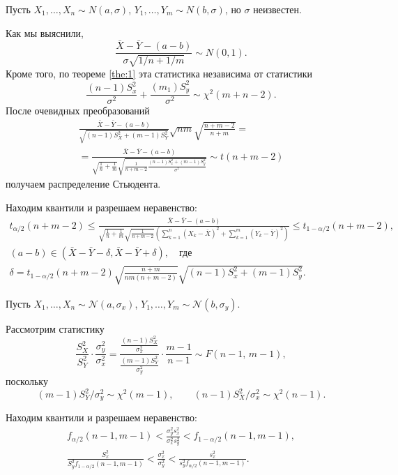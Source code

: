\begin{ex}[для $\Delta a$ при неизвестном $ \sigma_1 = \sigma_2 $]
Пусть $X_1, \dots, X_n \sim N(a, \sigma)$, $Y_1, \dots, Y_m \sim N(b, \sigma)$,
но $\sigma$ неизвестен.

Как мы выяснили,
\[
  \frac{\bar X - \bar Y - (a-b)}{\sigma \sqrt{1/n + 1/m}} \sim N(0, 1).
\]
Кроме того, по теореме \ref{the:1} эта статистика независима от статистики
\[
	\frac{(n-1)S_x^2}{\sigma^2} + \frac{(m_1) S_y^2}{\sigma^2} \sim \chi^2(m+n-2).
\]
После очевидных преобразований 
\begin{multline*}
	\frac{\bar X - \bar Y - (a-b)}{\sqrt{(n-1)S^2_X+(m-1)S^2_Y}} \sqrt{nm}
	\sqrt{\frac{n+m -2}{n+m}}= \\ =
	\frac{\bar X - \bar Y - (a-b)}{\sqrt{\frac1n + \frac1m}
	\sqrt{\frac{1}{n+m-2} \frac{(n-1) S_x^2 + (m-1)S_y^2}{\sigma^2}}} \sim
	t(n+m-2)
\end{multline*}
получаем распределение Стьюдента.

Находим квантили и разрешаем неравенство:
\begin{gather*}
	t_{\alpha/2}(n+m-2) \leqslant \frac{\bar X - \bar Y - (a-b)}{\sqrt{
	\frac{1}{n}+ \frac{1}{m}} \sqrt{ \frac{1}{n+m - 2}} \left( \sum_{k=1}^n \left(
X_k - \bar X\right)^2 + \sum_{k=1}^m \left( Y_k - \bar Y \right)^2 \right) }
\leqslant t_{1-\alpha/2} (n+m-2),\\
	(a-b) \in (\bar X - \bar Y - \delta, \bar X - \bar Y + \delta), \quad
	\text{где}\\
\delta = t_{1-\alpha/2} (n+m-2) \sqrt{\frac{n+m}{nm(n+m-2)}} \sqrt{(n-1)S_x^2 +
(m-1) S_y^2}.
\end{gather*}
\end{ex}

\begin{ex}
Пусть $X_1, \dots, X_n \sim \mathscr N(a, \sigma_x)$, $Y_1, \dots, Y_m
\sim\mathscr N(b, \sigma_y)$.

Рассмотрим статистику  
\[
		\frac{S^2_X}{S^2_Y}\cdot \frac{\sigma^2_y}{\sigma^2_x} =
		\frac{\frac{(n-1)S^2_X}{\sigma^2_x}}{\frac{(m-1)S^2_Y}{\sigma^2_y}} \cdot
		\frac{m-1}{n-1} \sim F(n-1,\,m-1),
\]
поскольку
\[
(m-1) S_Y^2 / \sigma_y^2 \sim \chi^2(m-1),\qquad (n-1) S_X^2 / \sigma_x^2 \sim
\chi^2(n-1).
\]

Находим квантили и разрешаем неравенство:
\begin{gather*}
f_{\alpha/2} (n-1, m-1) < \frac{\sigma_y^2 s_x^2}{\sigma_x^2 s_y^2} <
f_{1-\alpha/2} (n-1, m-1), \\
\frac{S_x^2}{S_y^2 f_{1-\alpha/2} (n-1, m-1)} < \frac{\sigma_x^2}{\sigma_y^2} <
\frac{s_x^2}{s_y^2 f_{\alpha/2} (n-1, m-1)}.
\end{gather*}
\end{ex}

